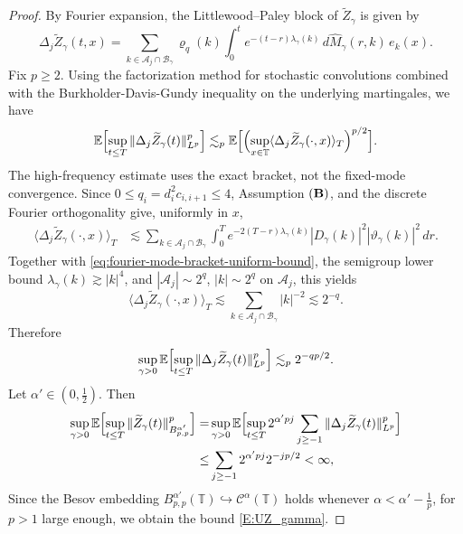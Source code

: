 \documentclass{article}
\begin{document}
\begin{proof}
By Fourier expansion, the Littlewood--Paley block of $\widetilde Z_\gamma$ is given by
\[
\Delta_j\widetilde Z_\gamma(t,x)
=
\sum_{k\in\mathcal A_j\cap\mathcal B_\gamma}
\varrho_q(k)
\int_0^t e^{-(t-r)\lambda_\gamma(k)}\,d\widehat M_\gamma(r,k)\,e_k(x).
\]
Fix \(p\ge2\). 
Using the factorization method for stochastic convolutions combined with the Burkholder-Davis-Gundy inequality on the underlying martingales, we have
\[
\mathbb E
\Bigl[
\sup_{t\le T}\|\Delta_j\widetilde Z_\gamma(t)\|_{L^p}^p
\Bigr]
\lesssim_p
\mathbb E
\Bigl[
\Bigl(
\sup_{x\in\mathbb T}
\langle \Delta_j\widetilde Z_\gamma(\cdot,x)\rangle_T
\Bigr)^{p/2}
\Bigr].
\]
The high-frequency estimate uses the exact bracket, not the fixed-mode
convergence.  Since \(0\le q_i=d_i^2c_{i,i+1}\le4\), Assumption \(({\bf B})\),
and the discrete Fourier orthogonality give, uniformly in \(x\),
\[
\begin{aligned}
\langle \Delta_j\widetilde Z_\gamma(\cdot,x)\rangle_T
&\lesssim
\sum_{k\in\mathcal A_j\cap\mathcal B_\gamma}
\int_0^T
e^{-2(T-r)\lambda_\gamma(k)}
|D_\gamma(k)|^2|\vartheta_\gamma(k)|^2\,dr .
\end{aligned}
\]
Together with \eqref{eq:fourier-mode-bracket-uniform-bound}, the semigroup
lower bound \(\lambda_\gamma(k)\gtrsim |k|^4\), and
\(|\mathcal A_j|\sim2^q\), \(|k|\sim2^q\) on \(\mathcal A_j\), this yields
\[
\langle \Delta_j\widetilde Z_\gamma(\cdot,x)\rangle_T
\lesssim
\sum_{k\in\mathcal A_j\cap\mathcal B_\gamma}|k|^{-2}
\lesssim 2^{-q}.
\]
Therefore
\[
\sup_{\gamma >0 }
\mathbb E
\Bigl[
\sup_{t\le T}\|\Delta_j\widetilde Z_\gamma(t)\|_{L^p}^p
\Bigr]
\lesssim_p 2^{-qp/2}.
\]
Let \(\alpha'\in(0,\frac12)\). Then
\begin{align}
    \sup_{\gamma >0 } \mathbb E
\Bigl[
\sup_{t\le T}\|\widetilde Z_\gamma(t)\|_{B^{\alpha'}_{p,p}}^p
\Bigr] = & \sup_{\gamma >0 } \mathbb E
\Bigl[ \sup_{t\le T} 2^{\alpha' pj} \sum_{j\ge-1}\|\Delta_j\widetilde Z_\gamma(t)\|_{L^p}^p \Bigr] \nonumber \\
 \leq & \sum_{j\ge-1}2^{\alpha' pj}2^{-j p/2}<\infty,
\end{align}
Since the Besov embedding \(B^{\alpha'}_{p,p}(\mathbb T)\hookrightarrow \mathcal C^\alpha(\mathbb T)\) holds whenever \(\alpha<\alpha'-\frac1p\), for \(p>1\) large enough, we obtain the bound \eqref{E:UZ_gamma}.


\end{proof}
\end{document}
